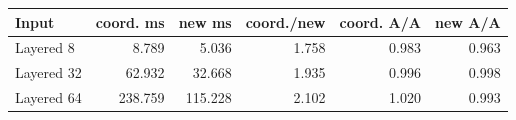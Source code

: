 \begin{center}
\small
\begin{tabular}{lrrrrr}
\toprule
Input & coord. ms & new ms & coord./new & coord. A/A & new A/A\\
\midrule
Layered 8 & 8.789 & 5.036 & 1.758 & 0.983 & 0.963\\
Layered 32 & 62.932 & 32.668 & 1.935 & 0.996 & 0.998\\
Layered 64 & 238.759 & 115.228 & 2.102 & 1.020 & 0.993\\
\bottomrule
\end{tabular}
\end{center}

